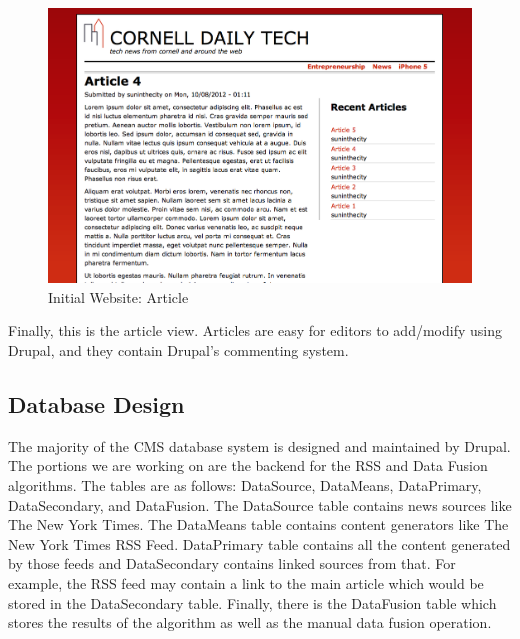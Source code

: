 \documentclass[12pt]{article} %
\begin{document}
\begin{figure}[htbp]
\begin{center}
\includegraphics[width=5in]{images/web-article}
\caption{Initial Website: Article}
\end{center}
\end{figure}
Finally, this is the article view. Articles are easy for editors to add/modify using Drupal, and they contain Drupal’s commenting system.

\subsection{Database Design}

The majority of the CMS database system is designed and maintained by Drupal. The portions we are working on are the backend for the RSS and Data Fusion algorithms. The tables are as follows: DataSource, DataMeans, DataPrimary, DataSecondary, and DataFusion. The DataSource table contains news sources like The New York Times. The DataMeans table contains content generators like The New York Times RSS Feed. DataPrimary table contains all the content generated by those feeds and DataSecondary contains linked sources from that. For example, the RSS feed may contain a link to the main article which would be stored in the DataSecondary table. Finally, there is the DataFusion table which stores the results of the algorithm as well as the manual data fusion operation.
\end{document}
